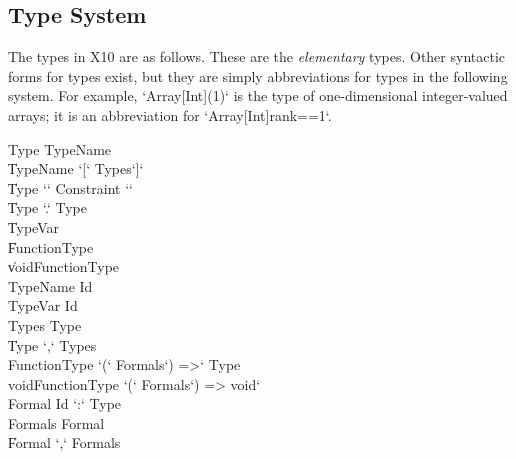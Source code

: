 \subsection{Type System}
The types in X10 are as follows.  
These are the {\em elementary} types. Other
syntactic forms for types exist, but they are simply abbreviations for types
in the following system.  For example, \xcd`Array[Int](1)` is the type of
one-dimensional integer-valued arrays; it is an abbreviation for
\xcd`Array[Int]{rank==1}`.\\
\begin{grammar}

Type \: TypeName \\
     \| TypeName \xcd`[` Types\opt \xcd`]` \\
     \| Type \xcd`{` Constraint \xcd`}` \\
     \| Type \xcd`.` Type \\
     \| TypeVar \\
     \| FunctionType\\
     \| voidFunctionType \\

TypeName \: Id \\
TypeVar \: Id \\
Types \: Type \\ 
      \| Type \xcd`,` Types \\
FunctionType \: \xcd`(` Formals\opt \xcd`) =>`  Type \\
voidFunctionType \: \xcd`(` Formals\opt \xcd`) => void` \\
Formal \: Id \xcd`:` Type \\
Formals \: Formal \\
        \| Formal \xcd`,` Formals      
\end{grammar}

